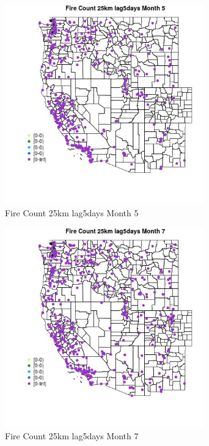 \begin{figure} 
\centering  
\includegraphics[width=0.77\textwidth]{Code_Outputs/Report_ML_input_PM25_Step4_part_e_de_duplicated_aves_compiled_2019-05-18wNAs_MapObsMo5Fire_Count_25km_lag5days.jpg} 
\caption{\label{fig:Report_ML_input_PM25_Step4_part_e_de_duplicated_aves_compiled_2019-05-18wNAsMapObsMo5Fire_Count_25km_lag5days}Fire Count 25km lag5days Month 5} 
\end{figure} 
 

\begin{figure} 
\centering  
\includegraphics[width=0.77\textwidth]{Code_Outputs/Report_ML_input_PM25_Step4_part_e_de_duplicated_aves_compiled_2019-05-18wNAs_MapObsMo7Fire_Count_25km_lag5days.jpg} 
\caption{\label{fig:Report_ML_input_PM25_Step4_part_e_de_duplicated_aves_compiled_2019-05-18wNAsMapObsMo7Fire_Count_25km_lag5days}Fire Count 25km lag5days Month 7} 
\end{figure} 
 

